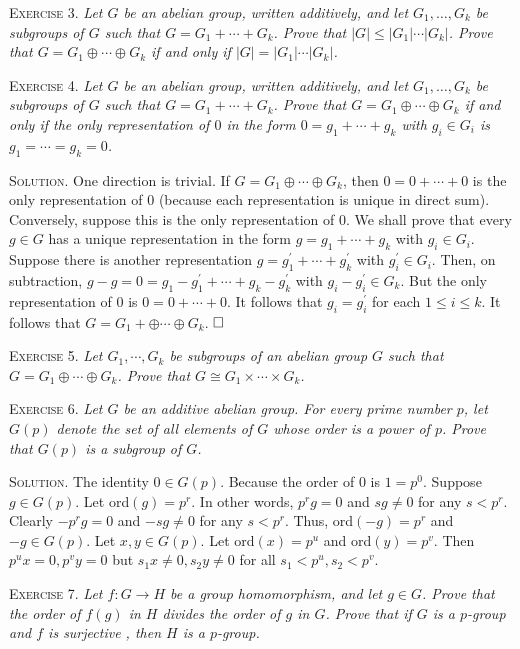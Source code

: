 \documentclass[11pt, leqno]{article}
\newcommand{\done}{\ensuremath{\hfill\square}}
\begin{document}
\textsc{Exercise 3}. \emph{Let $G$ be an abelian group, written additively, and let $G_1, \ldots, G_k$ be subgroups of $G$ such that $G = G_1 + \cdots + G_k$. Prove that $|G| \leq |G_1|\cdots |G_k|$. Prove that $G = G_1 \oplus \cdots \oplus G_k$ if and only if $|G| = |G_1|\cdots |G_k|$.}

\textsc{Exercise 4}. \emph{Let $G$ be an abelian group, written additively, and let $G_1, \ldots, G_k$ be subgroups of $G$ such that $G = G_1 + \cdots + G_k$. Prove that $G = G_1 \oplus \cdots \oplus G_k$ if and only if the only representation of $0$ in the form $0 = g_1 + \cdots + g_k$ with $g_i \in G_i$ is $g_1 = \cdots = g_k = 0$.}

\textsc{Solution}. One direction is trivial. If $G = G_1 \oplus \cdots \oplus G_k$, then $0 = 0 + \cdots + 0$ is the only representation of $0$ (because each representation is unique in direct sum). Conversely, suppose this is the only representation of $0$. We shall prove that every $g \in G$ has a unique representation in the form $g = g_1 + \cdots + g_k$ with $g_i \in G_i$. Suppose there is another representation $g = g_1^{\prime} + \cdots + g_k^{\prime}$ with $g_i^{\prime} \in G_i$. Then, on subtraction, $g - g = 0 = g_1 - g_1^{\prime} + \cdots + g_k - g_k^{\prime}$ with $g_i - g_i^{\prime} \in G_k$. But the only representation of $0$ is $0 = 0 + \cdots + 0$. It follows that $g_i = g_i^{\prime}$ for each $1 \leq i \leq k$. It follows that $G = G_1 + \oplus \cdots \oplus G_k$. \done

\textsc{Exercise 5}. \emph{Let $G_1, \cdots, G_k$ be subgroups of an abelian group $G$ such that $G = G_1 \oplus \cdots \oplus G_k$. Prove that $G \cong G_1 \times \cdots \times G_k$.}

\textsc{Exercise 6}. \emph{Let $G$ be an additive abelian group. For every prime number $p$, let $G(p)$ denote the set of all elements of $G$ whose order is a power of $p$. Prove that $G(p)$ is a subgroup of $G$.}

\textsc{Solution}. The identity $0 \in G(p)$. Because the order of $0$ is $1 = p^0$. Suppose $g \in G(p)$. Let ord$(g) = p^r$. In other words, $p^rg = 0$ and $sg \ne 0$ for any $s < p^r$. Clearly $-p^rg = 0$ and $-sg \ne 0$ for any $s < p^r$. Thus, ord$(-g) = p^r$ and $-g \in G(p)$. Let $x, y \in G(p)$. Let ord$(x) = p^u$ and ord$(y) = p^v$. Then $p^ux = 0, p^vy = 0$ but $s_1x \ne 0, s_2y \ne 0$ for all $s_1 < p^u, s_2 < p^v$.

\textsc{Exercise 7}. \emph{Let $f: G \to H$ be a group homomorphism, and let $g\in G$. Prove that the order of $f(g)$ in $H$ divides the order of $g$ in $G$. Prove that if $G$ is a $p$-group and $f$ is surjective , then $H$ is a $p$-group.}
\end{document}
